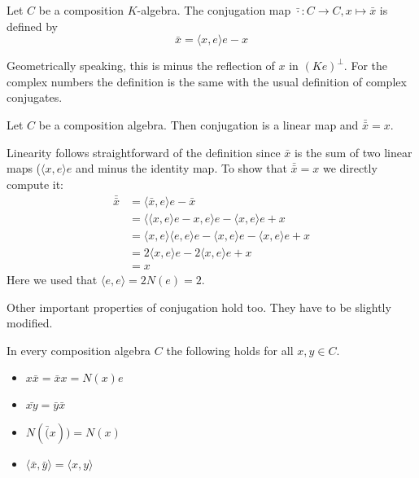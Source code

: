 \documentclass[../Thesis.tex]{subfiles}
\begin{document}
\begin{mydef}
Let $C$ be a composition $K$-algebra. The conjugation map $\bar{\cdot} : C \rightarrow C, x \mapsto \bar{x}$ is defined by
\begin{equation}
\bar{x} = \langle x, e \rangle e - x
\end{equation}
\end{mydef}
Geometrically speaking, this is minus the reflection of $x$ in $(Ke)^\perp$. For the complex numbers the definition is the same with the usual definition of complex conjugates.
\begin{prop}
Let $C$ be a composition algebra. Then conjugation is a linear map and $\bar{\bar{x}} = x$.
\end{prop}

\begin{myproof}
Linearity follows straightforward of the definition since $\bar{x}$ is the sum of two linear maps ($\langle x, e \rangle e $ and minus the identity map. To show that $\bar{\bar{x}} = x$ we directly compute it:
\begin{align*}
\bar{\bar{x}} &= \langle \bar{x}, e \rangle e - \bar{x}\\
&= \langle \langle x, e \rangle e - x, e \rangle e - \langle x, e \rangle e + x \\
&= \langle x, e \rangle \langle e, e \rangle e - \langle x, e \rangle e - \langle x, e \rangle e + x \\
&= 2 \langle x, e \rangle e - 2 \langle x ,e \rangle e + x \\
&= x
\end{align*}
Here we used that $\langle e, e \rangle = 2N(e) = 2$.
\end{myproof}
Other important properties of conjugation hold too. They have to be slightly modified.
\begin{prop}
In every composition algebra $C$ the following holds for all $x, y \in C$.
\begin{itemize}
\item $x \bar{x} = \bar{x} x = N(x) e$
\item $\bar{xy} = \bar{y}\bar{x}$
\item $N(\bar(x)) = N(x)$
\item $\langle \bar{x}, \bar{y} \rangle = \langle x, y \rangle$
\end{itemize}
\end{prop}
\end{document}
